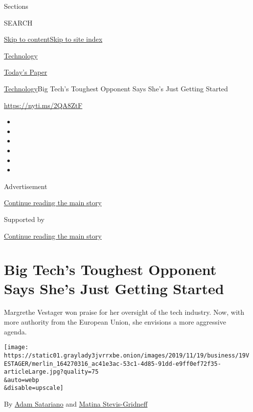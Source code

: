 Sections

SEARCH

\protect\hyperlink{site-content}{Skip to
content}\protect\hyperlink{site-index}{Skip to site index}

\href{https://www.nytimes3xbfgragh.onion/section/technology}{Technology}

\href{https://myaccount.nytimes3xbfgragh.onion/auth/login?response_type=cookie\&client_id=vi}{}

\href{https://www.nytimes3xbfgragh.onion/section/todayspaper}{Today's
Paper}

\href{/section/technology}{Technology}\textbar{}Big Tech's Toughest
Opponent Says She's Just Getting Started

\url{https://nyti.ms/2QA8ZtF}

\begin{itemize}
\item
\item
\item
\item
\item
\item
\end{itemize}

Advertisement

\protect\hyperlink{after-top}{Continue reading the main story}

Supported by

\protect\hyperlink{after-sponsor}{Continue reading the main story}

\hypertarget{big-techs-toughest-opponent-says-shes-just-getting-started}{%
\section{Big Tech's Toughest Opponent Says She's Just Getting
Started}\label{big-techs-toughest-opponent-says-shes-just-getting-started}}

Margrethe Vestager won praise for her oversight of the tech industry.
Now, with more authority from the European Union, she envisions a more
aggressive agenda.

\texttt{[image: https://static01.graylady3jvrrxbe.onion/images/2019/11/19/business/19VESTAGER/merlin\_164270316\_ac41e3ac-53c1-4d85-91dd-e9ff0ef72f35-articleLarge.jpg?quality=75\\\&auto=webp\\\&disable=upscale]}

By \href{https://www.nytimes3xbfgragh.onion/by/adam-satariano}{Adam
Satariano} and
\href{https://www.nytimes3xbfgragh.onion/by/matina-stevis-gridneff}{Matina
Stevis-Gridneff}

